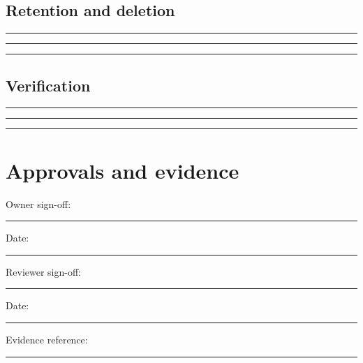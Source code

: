 \documentclass[11pt]{article}
\begin{document}
\subsection{Retention and deletion}
\noindent\rule{\linewidth}{0.3pt}\par\vspace{0.18in}
\noindent\rule{\linewidth}{0.3pt}\par\vspace{0.18in}
\noindent\rule{\linewidth}{0.3pt}\par\vspace{0.14in}

\subsection{Verification}
\noindent\rule{\linewidth}{0.3pt}\par\vspace{0.18in}
\noindent\rule{\linewidth}{0.3pt}\par\vspace{0.18in}
\noindent\rule{\linewidth}{0.3pt}\par\vspace{0.14in}

\section{Approvals and evidence}
\noindent Owner sign-off: \rule{0.42\linewidth}{0.4pt}\hfill Date: \rule{0.19\linewidth}{0.4pt}\par\vspace{0.4cm}
\noindent Reviewer sign-off: \rule{0.40\linewidth}{0.4pt}\hfill Date: \rule{0.19\linewidth}{0.4pt}\par\vspace{0.4cm}
\noindent Evidence reference: \rule{0.70\linewidth}{0.4pt}
\end{document}
